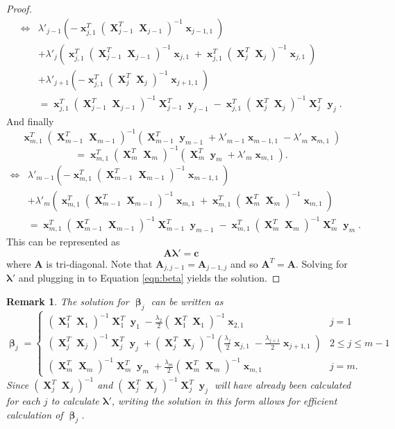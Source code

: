 \documentclass[12pt]{article}
\DeclareMathOperator{\bx}{\textbf{x}}
\DeclareMathOperator{\bX}{\textbf{X}}
\DeclareMathOperator{\by}{\textbf{y}}
\DeclareMathOperator{\bbeta}{\boldsymbol{\beta}}
\newtheorem*{remark}{Remark}
\begin{document}
\begin{proof}
\begin{align*} 
\iff &  \lambda'_{j-1} \left(-\bx_{j,1}^T(\bX_{j-1}^T  \bX_{j-1})^{-1}\bx_{j-1, 1}\right) \\ 
& +  \lambda'_j \left(\bx_{j,1}^T(\bX_{j-1}^T  \bX_{j-1})^{-1}\bx_{j, 1}+\bx_{j,1}^T(\bX_j^T  \bX_j)^{-1}\bx_{j, 1}\right) \\
& +  \lambda'_{j+1}\left(-\bx_{j,1}^T(\bX_j^T  \bX_j)^{-1}\bx_{j+1, 1}\right) \\
& =\bx_{j,1}^T(\bX_{j-1}^T  \bX_{j-1})^{-1}\bX_{j-1}^T\by_{j-1}-\bx_{j,1}^T(\bX_j^T  \bX_j)^{-1} \bX_j^T \by_j.
\end{align*}
And finally
$$\bx_{m,1}^T(\bX_{m-1}^T  \bX_{m-1})^{-1}\left(\bX_{m-1}^T \by_{m-1} + \lambda'_{m-1}\bx_{m-1, 1}-\lambda'_{m}\bx_{m, 1}\right) $$
$$= \bx_{m,1}^T(\bX_m^T  \bX_m)^{-1} \left( \bX_m^T \by_m + \lambda'_{m}\bx_{m, 1} \right).$$
\begin{align*}
\iff & \lambda'_{m-1}\left(-\bx_{m,1}^T(\bX_{m-1}^T  \bX_{m-1})^{-1}\bx_{m-1, 1}\right) \\
& + \lambda'_m\left(\bx_{m,1}^T(\bX_{m-1}^T  \bX_{m-1})^{-1}\bx_{m, 1}+\bx_{m,1}^T(\bX_m^T \bX_m)^{-1}\bx_{m, 1} \right) \\
& = \bx_{m,1}^T(\bX_{m-1}^T  \bX_{m-1})^{-1}\bX_{m-1}^T \by_{m-1}-\bx_{m,1}^T(\bX_m^T \bX_m)^{-1}\bX_m^T\by_m.
\end{align*}
This can be represented as 
$$\mathbf{A} \boldsymbol{\lambda}'=\mathbf{c}$$
where $\mathbf{A}$ is tri-diagonal. Note that $\mathbf{A}_{j, j-1}=\mathbf{A}_{j-1,j}$ and so $\mathbf{A}^T=\mathbf{A}$. Solving for $\boldsymbol{\lambda}'$ and plugging in to Equation \ref{eqn:beta} yields the solution.
\end{proof}
\begin{remark}
The solution for $\bbeta_j$ can be written as
$$\bbeta_j=\begin{cases}
(\bX_1^T  \bX_1)^{-1}\bX_1^T \by_1 -\frac{\lambda_{2}}{2}(\bX_1^T  \bX_1)^{-1}\bx_{2, 1} & j=1 \\
(\bX_j^T  \bX_j)^{-1}\bX_j^T \by_j + (\bX_j^T  \bX_j)^{-1}(\frac{\lambda_j}{2}\bx_{j, 1}-\frac{\lambda_{j+1}}{2}\bx_{j+1, 1}) & 2 \leq j \leq m-1 \\
(\bX_m^T \bX_m)^{-1}\bX_m^T \by_m + \frac{\lambda_m}{2}(\bX_m^T \bX_m)^{-1}\bx_{m, 1} & j=m.
\end{cases}$$
Since $(\bX_j^T  \bX_j)^{-1}$ and $(\bX_j^T  \bX_j)^{-1}\bX_j^T \by_j$ will have already been calculated for each $j$ to calculate $\boldsymbol{\lambda}'$, writing the solution in this form allows for efficient calculation of $\bbeta_j$.
\end{remark}
\end{document}
